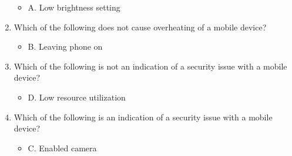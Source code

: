 \documentclass{article}
\begin{document}
\begin{enumerate}
    \begin{itemize}
        \item A. Low brightness setting
    \end{itemize}
    \item Which of the following does not cause overheating of a mobile device?
    \begin{itemize}
        \item B. Leaving phone on
    \end{itemize}
    \item Which of the following is not an indication of a security issue with a mobile device?
    \begin{itemize}
        \item D. Low resource utilization
    \end{itemize}
    \item Which of the following is an indication of a security issue with a mobile device?
    \begin{itemize}
        \item C. Enabled camera
    \end{itemize}
\end{enumerate}
\end{document}

